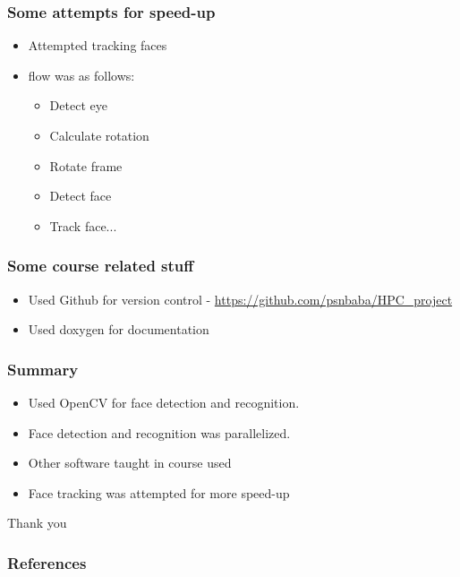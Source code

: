 \documentclass[aspectratio=149]{beamer}
\begin{document}

\begin{frame}
\frametitle{Some attempts for speed-up}
\begin{itemize}
	\item Attempted tracking faces
	\item flow was as follows:
	\begin{itemize}
		\item Detect eye
		\item Calculate rotation
		\item Rotate frame
		\item Detect face
		\item Track face...
	\end{itemize}	
\end{itemize}
\end{frame}


\begin{frame}
\frametitle{Some course related stuff}
\begin{itemize}
	\item Used Github for version control - \url{https://github.com/psnbaba/HPC_project}
	\item Used doxygen for documentation	
\end{itemize}
\end{frame}


\begin{frame}
\frametitle{Summary}
\begin{itemize}
	\item Used OpenCV for face detection and recognition.
	\item Face detection and recognition was parallelized.
	\item Other software taught in course used
	\item Face tracking was attempted for more speed-up	
\end{itemize}
\end{frame}


\begin{frame}
    \centering
    Thank you
\end{frame}

\begin{frame}[t,allowframebreaks]
  \frametitle{References}
  \printbibliography{}
\end{frame}


\end{document}
